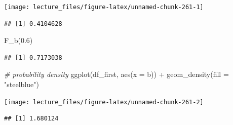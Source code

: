 \documentclass[
]{book}
\newenvironment{Shaded}{\begin{snugshade}}{\end{snugshade}}
\newcommand{\AttributeTok}[1]{\textcolor[rgb]{0.77,0.63,0.00}{#1}}
\newcommand{\CommentTok}[1]{\textcolor[rgb]{0.56,0.35,0.01}{\textit{#1}}}
\newcommand{\FloatTok}[1]{\textcolor[rgb]{0.00,0.00,0.81}{#1}}
\newcommand{\FunctionTok}[1]{\textcolor[rgb]{0.00,0.00,0.00}{#1}}
\newcommand{\NormalTok}[1]{#1}
\newcommand{\OtherTok}[1]{\textcolor[rgb]{0.56,0.35,0.01}{#1}}
\newcommand{\SpecialCharTok}[1]{\textcolor[rgb]{0.00,0.00,0.00}{#1}}
\newcommand{\StringTok}[1]{\textcolor[rgb]{0.31,0.60,0.02}{#1}}
\begin{document}
\begin{center}\texttt{[image: lecture\_files/figure-latex/unnamed-chunk-261-1]} \end{center}

\begin{Shaded}
\end{Shaded}

\begin{verbatim}
## [1] 0.4104628
\end{verbatim}

\begin{Shaded}
\begin{Highlighting}[]
\FunctionTok{F\_b}\NormalTok{(}\FloatTok{0.6}\NormalTok{)}
\end{Highlighting}
\end{Shaded}

\begin{verbatim}
## [1] 0.7173038
\end{verbatim}

\begin{Shaded}
\begin{Highlighting}[]
\CommentTok{\# probability density}
\FunctionTok{ggplot}\NormalTok{(df\_first, }\FunctionTok{aes}\NormalTok{(}\AttributeTok{x =}\NormalTok{ b)) }\SpecialCharTok{+} \FunctionTok{geom\_density}\NormalTok{(}\AttributeTok{fill =} \StringTok{"steelblue"}\NormalTok{)}
\end{Highlighting}
\end{Shaded}

\begin{center}\texttt{[image: lecture\_files/figure-latex/unnamed-chunk-261-2]} \end{center}

\begin{Shaded}
\end{Shaded}

\begin{verbatim}
## [1] 1.680124
\end{verbatim}
\end{document}
